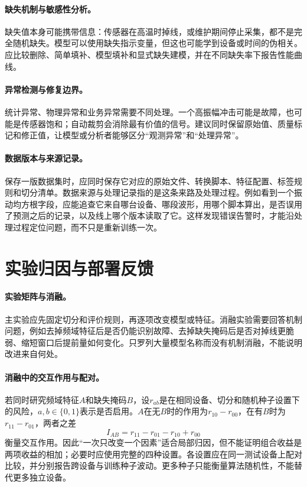 \paragraph{缺失机制与敏感性分析。}
缺失值本身可能携带信息：传感器在高温时掉线，或维护期间停止采集，都不是完全随机缺失。模型可以使用缺失指示变量，但这也可能学到设备或时间的伪相关。应比较删除、简单填补、模型填补和显式缺失建模，并在不同缺失率下报告性能曲线。

\paragraph{异常检测与修复边界。}
统计异常、物理异常和业务异常需要不同处理。一个高振幅冲击可能是故障，也可能是传感器饱和；自动裁剪会消除最有价值的信号。建议同时保留原始值、质量标记和修正值，让模型或分析者能够区分“观测异常”和“处理异常”。

\paragraph{数据版本与来源记录。}
保存一版数据集时，应同时保存它对应的原始文件、转换脚本、特征配置、标签规则和切分清单。数据来源与处理记录指的是这条来路及处理过程。例如看到一个振动均方根字段，应能追查它来自哪台设备、哪段波形，用哪个脚本算出，是否误用了预测之后的记录，以及线上哪个版本读取了它。这样发现错误告警时，才能沿处理过程定位问题，而不只是重新训练一次。

\section{实验归因与部署反馈}
\paragraph{实验矩阵与消融。}
主实验应先固定切分和评价规则，再逐项改变模型或特征。消融实验需要回答机制问题，例如去掉频域特征后是否仍能识别故障、去掉缺失掩码后是否对掉线更脆弱、缩短窗口后提前量如何变化。只罗列大量模型名称而没有机制消融，不能说明改进来自何处。

\paragraph{消融中的交互作用与配对。}
若同时研究频域特征$A$和缺失掩码$B$，设$r_{ab}$是在相同设备、切分和随机种子设置下的风险，$a,b\in\{0,1\}$表示是否启用。$A$在无$B$时的作用为$r_{10}-r_{00}$，在有$B$时为$r_{11}-r_{01}$，两者之差
\begin{equation}
 I_{AB}=r_{11}-r_{01}-r_{10}+r_{00}
\end{equation}
衡量交互作用。因此“一次只改变一个因素”适合局部归因，但不能证明组合收益是两项收益的相加；必要时应使用完整的四种设置。各设置应在同一测试设备上配对比较，并分别报告跨设备与训练种子波动。更多种子只能衡量算法随机性，不能替代更多独立设备。

